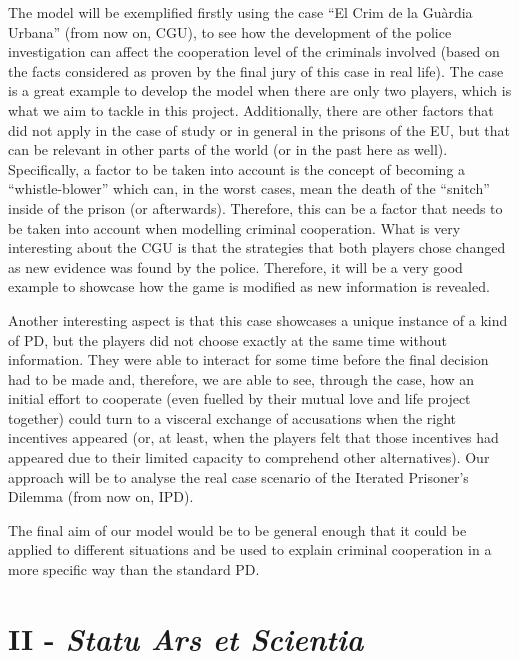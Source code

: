 \documentclass[11pt, a4paper]{article}
\begin{document}
The model will be exemplified firstly using the case “El Crim de la Guàrdia Urbana” (from now on, CGU), to see how the development of the police investigation can affect the cooperation level of the criminals involved (based on the facts considered as proven by the final jury of this case in real life). The case is a great example to develop the model when there are only two players, which is what we aim to tackle in this project. Additionally, there are other factors that did not apply in the case of study or in general in the prisons of the EU, but that can be relevant in other parts of the world (or in the past here as well). Specifically, a factor to be taken into account is the concept  of becoming a “whistle-blower” which can, in the worst cases, mean the death of the “snitch” inside of the prison (or afterwards). Therefore, this can be a factor that needs to be taken into account when modelling criminal cooperation. What is very interesting about the CGU is that the strategies that both players chose changed as new evidence was found by the police. Therefore, it will be a very good example to showcase how the game is modified as new information is revealed. 

Another interesting aspect is that this case showcases a unique instance of a kind of PD, but the players did not choose exactly at the same time without information. They were able to interact for some time before the final decision had to be made and, therefore, we are able to see, through the case, how an initial effort to cooperate (even fuelled by their mutual love and life project together) could turn to a visceral exchange of accusations when the right incentives appeared (or, at least, when the players felt that those incentives had appeared due to their limited capacity to comprehend other alternatives). Our approach will be to analyse the real case scenario of the Iterated Prisoner’s Dilemma (from now on, IPD).  

The final aim of our model would be to be general enough that it could be applied to different situations and be used to explain criminal cooperation in a more specific way than the standard PD.

\section*{II - \textit{Statu Ars et Scientia}}
\end{document}
